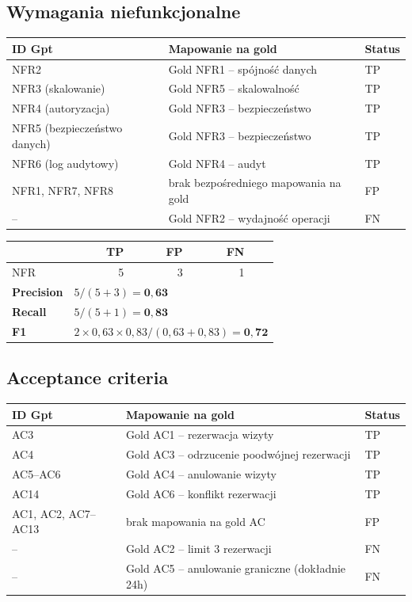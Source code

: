 \documentclass[12pt,a4paper]{article}
\newcommand{\tp}[1]{\colorbox{tpcolor}{\small #1}}
\newcommand{\fp}[1]{\colorbox{fpcolor}{\small #1}}
\newcommand{\fn}[1]{\colorbox{fncolor}{\small #1}}
\begin{document}
\vspace{1em}
\subsection{Wymagania niefunkcjonalne}

\begin{tabular}{p{2.5cm} p{7cm} l}
\toprule
\textbf{ID Gpt} & \textbf{Mapowanie na gold} & \textbf{Status} \\
\midrule
NFR2 & Gold NFR1 -- spójność danych & \tp{TP} \\
NFR3 (skalowanie)    & Gold NFR5 -- skalowalność & \tp{TP} \\
NFR4 (autoryzacja)   & Gold NFR3 -- bezpieczeństwo & \tp{TP} \\
NFR5 (bezpieczeństwo danych)        & Gold NFR3 -- bezpieczeństwo & \tp{TP} \\
NFR6 (log audytowy)  & Gold NFR4 -- audyt & \tp{TP} \\
NFR1, NFR7, NFR8 & brak bezpośredniego mapowania na gold & \fp{FP} \\
\midrule
-- & Gold NFR2 -- wydajność operacji & \fn{FN} \\
\bottomrule
\end{tabular}

\vspace{0.5em}
\begin{tabular}{lrrrr}
\toprule
& \textbf{TP} & \textbf{FP} & \textbf{FN} & \\
\midrule
NFR & 5 & 3 & 1 & \\
\midrule
\textbf{Precision} & \multicolumn{4}{l}{$5 / (5+3) = \mathbf{0{,}63}$} \\
\textbf{Recall}    & \multicolumn{4}{l}{$5 / (5+1) = \mathbf{0{,}83}$} \\
\textbf{F1}        & \multicolumn{4}{l}{$2 \times 0{,}63 \times 0{,}83 / (0{,}63+0{,}83) = \mathbf{0{,}72}$} \\
\bottomrule
\end{tabular}

\vspace{1em}
\subsection{Acceptance criteria}

\begin{tabular}{p{2.5cm} p{7cm} l}
\toprule
\textbf{ID Gpt} & \textbf{Mapowanie na gold} & \textbf{Status} \\
\midrule
AC3 & Gold AC1 -- rezerwacja wizyty & \tp{TP} \\
AC4 & Gold AC3 -- odrzucenie poodwójnej rezerwacji  & \tp{TP} \\
AC5--AC6 & Gold AC4 -- anulowanie wizyty & \tp{TP} \\
AC14 & Gold AC6 -- konflikt rezerwacji  & \tp{TP} \\
AC1, AC2, AC7--AC13 & brak mapowania na gold AC & \fp{FP} \\
\midrule
-- & Gold AC2 -- limit 3 rezerwacji & \fn{FN} \\
-- & Gold AC5 -- anulowanie graniczne (dokładnie 24h) & \fn{FN} \\
\bottomrule
\end{tabular}
\end{document}
